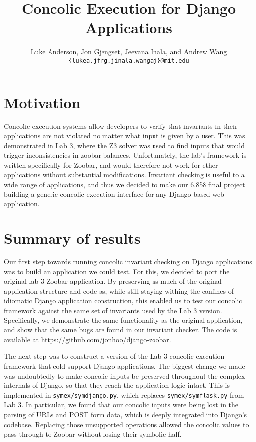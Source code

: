 \documentclass{article}
\author{
Luke Anderson, Jon Gjengset, Jeevana Inala, and Andrew Wang \\
\texttt{\{lukea,jfrg,jinala,wangaj\}@mit.edu}
}
\title{Concolic Execution for Django Applications}
\date{}
\begin{document}
\maketitle
\section{Motivation}
Concolic execution systems allow developers to verify that invariants in their
applications are not violated no matter what input is given by a user. This was
demonstrated in Lab 3, where the Z3 solver was used to find inputs that would
trigger inconsistencies in zoobar balances. Unfortunately, the lab's framework
is written specifically for Zoobar, and would therefore not work for other
applications without substantial modifications.  Invariant checking is useful
to a wide range of applications, and thus we decided to make our 6.858 final
project building a generic concolic execution interface for any Django-based
web application.

\section{Summary of results}

Our first step towards running concolic invariant checking on Django
applications was to build an application we could test. For this, we decided to
port the original lab 3 Zoobar application. By preserving as much of the
original application structure and code as, while still staying withing the
confines of idiomatic Django application construction, this enabled us to test
our concolic framework against the same set of invariants used by the Lab 3
version. Specifically, we demonstrate the same functionality as the original
application, and show that  the same bugs are found in our invariant checker.
The code is available at \url{https://github.com/jonhoo/django-zoobar}.

The next step was to construct a version of the Lab 3 concolic execution
framework that cold support Django applications. The biggest change
we made was undoubtedly to make concolic inputs be preserved throughout the
complex internals of Django, so that they reach the application logic
intact. This is implemented in \texttt{symex/symdjango.py}, which replaces
\texttt{symex/symflask.py} from Lab 3. In particular, we found that our
concolic inputs were being lost in the parsing of URLs and POST form data,
which is deeply integrated into Django's codebase. Replacing those unsupported
operations allowed the concolic values to pass through to Zoobar without losing
their symbolic half.
\end{document}
